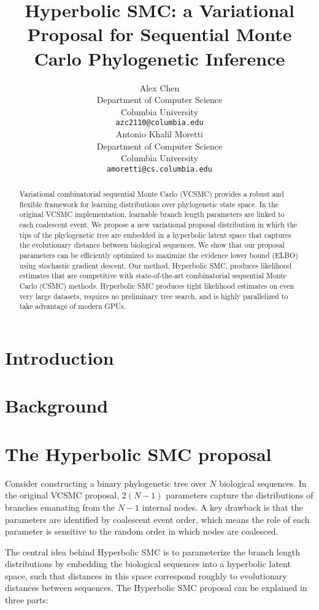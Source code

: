 \documentclass{article}
\title{Hyperbolic SMC: a Variational Proposal for Sequential Monte Carlo Phylogenetic Inference}
\author{%
  Alex Chen \\
  Department of Computer Science \\
  Columbia University \\
  \texttt{azc2110@columbia.edu} \\
  \And
  Antonio Khalil Moretti \\
  Department of Computer Science \\
  Columbia University \\
  \texttt{amoretti@cs.columbia.edu} \\
}
\begin{document}
\maketitle


\begin{abstract}
  Variational combinatorial sequential Monte Carlo (VCSMC) provides a robust and flexible framework for learning distributions over phylogenetic state space. In the original VCSMC implementation, learnable branch length parameters are linked to each coalescent event. We propose a new variational proposal distribution in which the tips of the phylogenetic tree are embedded in a hyperbolic latent space that captures the evolutionary distance between biological sequences. We show that our proposal parameters can be efficiently optimized to maximize the evidence lower bound (ELBO) using stochastic gradient descent. Our method, Hyperbolic SMC, produces likelihood estimates that are competitive with state-of-the-art combinatorial sequential Monte Carlo (CSMC) methods. Hyperbolic SMC produces tight likelihood estimates on even very large datasets, requires no preliminary tree search, and is highly parallelized to take advantage of modern GPUs.
\end{abstract}

\section{Introduction}


\section{Background}


\section{The Hyperbolic SMC proposal}


Consider constructing a binary phylogenetic tree over $N$ biological sequences. In the original VCSMC proposal, $2(N-1)$ parameters capture the distributions of branches emanating from the $N-1$ internal nodes. A key drawback is that the parameters are identified by coalescent event order, which means the role of each parameter is sensitive to the random order in which nodes are coalesced.


The central idea behind Hyperbolic SMC is to parameterize the branch length distributions by embedding the biological sequences into a hyperbolic latent space, such that distances in this space correspond roughly to evolutionary distances between sequences. The Hyperbolic SMC proposal can be explained in three parts:
\end{document}
